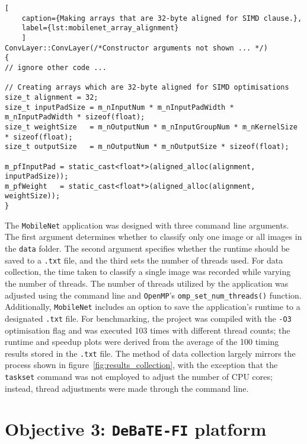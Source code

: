 \begin{lstlisting}[
	caption={Making arrays that are 32-byte aligned for SIMD clause.},
	label={lst:mobilenet_array_alignment}
	]
ConvLayer::ConvLayer(/*Constructor arguments not shown ... */) 
{
// ignore other code ... 

// Creating arrays which are 32-byte aligned for SIMD optimisations 
size_t alignment = 32;
size_t inputPadSize = m_nInputNum * m_nInputPadWidth * m_nInputPadWidth * sizeof(float);
size_t weightSize   = m_nOutputNum * m_nInputGroupNum * m_nKernelSize * sizeof(float);
size_t outputSize   = m_nOutputNum * m_nOutputSize * sizeof(float);

m_pfInputPad = static_cast<float*>(aligned_alloc(alignment, inputPadSize));
m_pfWeight   = static_cast<float*>(aligned_alloc(alignment, weightSize));
}
\end{lstlisting}

The \texttt{MobileNet} application was designed with three command line arguments. The first argument determines whether to classify only one image or all images in the \texttt{data} folder. The second argument specifies whether the runtime should be saved to a \texttt{.txt} file, and the third sets the number of threads used. For data collection, the time taken to classify a single image was recorded while varying the number of threads. The number of threads utilized by the application was adjusted using the command line and \texttt{OpenMP}'s \texttt{omp\_set\_num\_threads()} function. Additionally, \texttt{MobileNet} includes an option to save the application's runtime to a designated \texttt{.txt} file. For benchmarking, the project was compiled with the \texttt{-O3} optimisation flag and was executed 103 times with different thread counts; the runtime and speedup plots were derived from the average of the 100 timing results stored in the \texttt{.txt} file. The method of data collection largely mirrors the process shown in figure~\ref{fig:results_collection}, with the exception that the \texttt{taskset} command was not employed to adjust the number of CPU cores; instead, thread adjustments were made through the command line.

\section{Objective 3: \texttt{DeBaTE-FI} platform}

